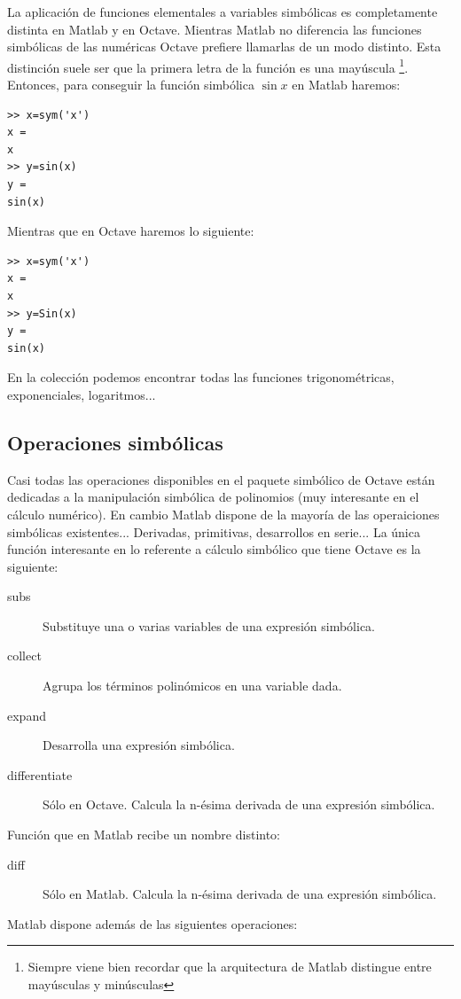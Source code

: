 La aplicación de funciones elementales a variables simbólicas es completamente
distinta en Matlab y en Octave. Mientras Matlab no diferencia las
funciones simbólicas de las numéricas Octave prefiere llamarlas de
un modo distinto. Esta distinción suele ser que la primera letra de
la función es una mayúscula%
\footnote{Siempre viene bien recordar que la arquitectura de Matlab distingue
entre mayúsculas y minúsculas%
}. Entonces, para conseguir la función simbólica $\sin x$ en Matlab
haremos:

  \begin{verbatim}
>> x=sym('x')
x =
x
>> y=sin(x)
y =
sin(x)
 \end{verbatim}
Mientras que en Octave haremos lo siguiente:

  \begin{verbatim}
>> x=sym('x')
x =
x
>> y=Sin(x)
y =
sin(x)
 \end{verbatim}
En la colección podemos encontrar todas las funciones trigonométricas,
exponenciales, logaritmos...


\subsection{Operaciones simbólicas}

Casi todas las operaciones disponibles en el paquete simbólico de
Octave están dedicadas a la manipulación simbólica de polinomios (muy
interesante en el cálculo numérico). En cambio Matlab dispone de la
mayoría de las operaiciones simbólicas existentes... Derivadas, primitivas,
desarrollos en serie... La única función interesante en lo referente
a cálculo simbólico que tiene Octave es la siguiente:

\begin{description}
\item [subs]Substituye una o varias variables de una expresión
simbólica.
\item [collect]Agrupa los términos polinómicos en una variable
dada.
\item [expand]Desarrolla una expresión simbólica.
\item [differentiate]Sólo en Octave. Calcula la n-ésima
derivada de una expresión simbólica.
\end{description}
Función que en Matlab recibe un nombre distinto:

\begin{description}
\item [diff]Sólo en Matlab. Calcula la n-ésima derivada de
una expresión simbólica.
\end{description}
Matlab dispone además de las siguientes operaciones:

